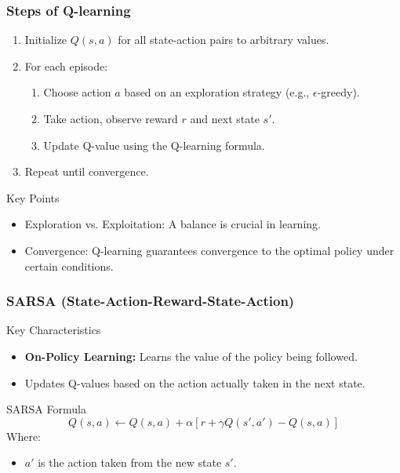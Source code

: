 \documentclass[aspectratio=169]{beamer}
\begin{document}
\begin{frame}[fragile]
    \frametitle{Steps of Q-learning}
    \begin{enumerate}
        \item Initialize $Q(s, a)$ for all state-action pairs to arbitrary values.
        \item For each episode:
        \begin{enumerate}
            \item Choose action $a$ based on an exploration strategy (e.g., $\epsilon$-greedy).
            \item Take action, observe reward $r$ and next state $s'$.
            \item Update Q-value using the Q-learning formula.
        \end{enumerate}
        \item Repeat until convergence.
    \end{enumerate}
    
    \begin{block}{Key Points}
        \begin{itemize}
            \item Exploration vs. Exploitation: A balance is crucial in learning.
            \item Convergence: Q-learning guarantees convergence to the optimal policy under certain conditions.
        \end{itemize}
    \end{block}
\end{frame}

\begin{frame}[fragile]
    \frametitle{SARSA (State-Action-Reward-State-Action)}
    \begin{block}{Key Characteristics}
        \begin{itemize}
            \item \textbf{On-Policy Learning:} Learns the value of the policy being followed.
            \item Updates Q-values based on the action actually taken in the next state.
        \end{itemize}
    \end{block}

    \begin{block}{SARSA Formula}
        \begin{equation}
            Q(s, a) \leftarrow Q(s, a) + \alpha \left[ r + \gamma Q(s', a') - Q(s, a) \right]
        \end{equation}
        Where:
        \begin{itemize}
            \item $a'$ is the action taken from the new state $s'$.
        \end{itemize}
    \end{block}
\end{frame}
\end{document}
